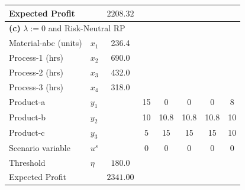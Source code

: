 \documentclass[7pt]{article}
\begin{document}
\begin{table}[h!]
\begin{tabular}{ll|c|ccccc}
        Expected Profit       &                                            & $2208.32$       &                                                                                     \\
        \midrule
        \multicolumn{8}{l}{\textbf{(c)} $\lambda := 0$ and Risk-Neutral RP}                                                                                                        \\
        \midrule
        Material-abc (units)  & $x_1$                                      & 236.4           &              &                   &               &                  &               \\
        Process-1 (hrs)       & $x_2$                                      & 690.0           &              &                   &               &                  &               \\
        Process-2 (hrs)       & $x_3$                                      & 432.0           &              &                   &               &                  &               \\
        Process-3 (hrs)       & $x_4$                                      & 318.0           &              &                   &               &                  &               \\
        Product-a             & $y_1$                                      &                 & 15           & 0                 & 0             & 0                & 8             \\
        Product-b             & $y_2$                                      &                 & 10           & 10.8              & 10.8          & 10.8             & 10            \\
        Product-c             & $y_3$                                      &                 & 5            & 15                & 15            & 15               & 10            \\
        Scenario variable     & $u^s$                                      &                 & 0            & 0                 & 0             & 0                & 0             \\
        Threshold             & $\eta$                                     & $180.0$         &                                                                                     \\
        Expected Profit       &                                            & $2341.00$       &                                                                                     \\
        \bottomrule
    \end{tabular}
\end{table}
\end{document}
